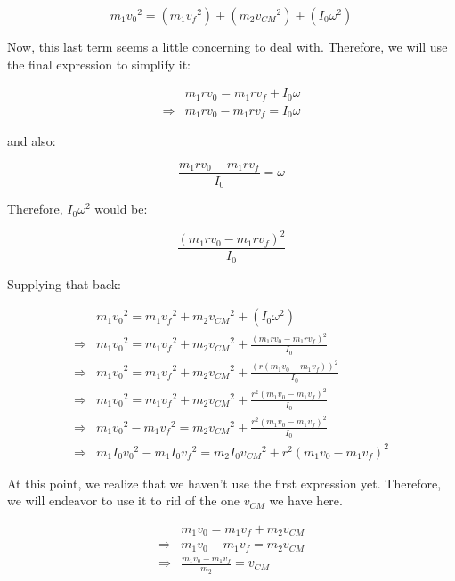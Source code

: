 \documentclass[letterpaper]{article}
\begin{document}
\begin{equation}
 m_1{v_0}^2 = \left( m_1{v_f}^2\right)+\left( m_2{v_{CM}}^2\right)+\left( I_0{\omega}^2\right)   
\end{equation}

Now, this last term seems a little concerning to deal with. Therefore, we will use the final expression to simplify it:

\begin{align}
   &m_1 rv_0 = m_1rv_f + I_0 \omega\\
\Rightarrow & m_1 rv_0 - m_1rv_f = I_0 \omega
\end{align}

and also:

\begin{equation}
 \frac{m_1 rv_0 - m_1rv_f}{I_0} = \omega   
\end{equation}

Therefore, \(I_0 \omega^2\) would be:

\begin{equation}
    \frac{(m_1 rv_0 - m_1rv_f)^2}{I_0}
\end{equation}

Supplying that back:

\begin{align}
 &m_1{v_0}^2 =  m_1{v_f}^2+m_2{v_{CM}}^2+\left( I_0{\omega}^2\right)\\
\Rightarrow & m_1{v_0}^2 = m_1{v_f}^2+ m_2{v_{CM}}^2+\frac{(m_1 rv_0 - m_1rv_f)^2}{I_0}\\
\Rightarrow & m_1{v_0}^2 = m_1{v_f}^2+ m_2{v_{CM}}^2+\frac{(r(m_1 v_0 - m_1v_f))^2}{I_0}\\
\Rightarrow & m_1{v_0}^2 = m_1{v_f}^2+ m_2{v_{CM}}^2+\frac{r^2(m_1 v_0 - m_1v_f)^2}{I_0}\\
\Rightarrow & m_1{v_0}^2 -m_1{v_f}^2 =  m_2{v_{CM}}^2+\frac{r^2(m_1 v_0 - m_1v_f)^2}{I_0}\\
\Rightarrow & m_1I_0{v_0}^2 -m_1I_0{v_f}^2 =  m_2I_0{v_{CM}}^2+r^2(m_1 v_0 - m_1v_f)^2
\end{align}

At this point, we realize that we haven't use the first expression yet. Therefore, we will endeavor to use it to rid of the one \(v_{CM}\) we have here.

\begin{align}
 &m_1 v_0 = m_1v_f + m_2 v_{CM} \\
\Rightarrow &m_1 v_0 -m_1v_f =  m_2 v_{CM} \\
\Rightarrow &\frac{m_1 v_0 -m_1v_f}{m_2} = v_{CM} 
\end{align}
\end{document}
